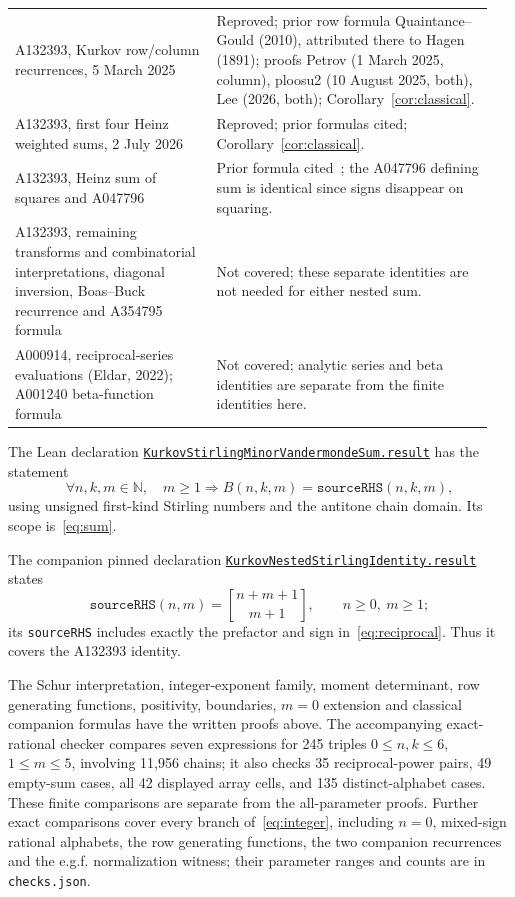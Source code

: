 \documentclass[11pt]{article}
\newcommand{\stir}[2]{\genfrac{[}{]}{0pt}{}{#1}{#2}}
\begin{document}
\begin{longtable}{@{}p{0.40\linewidth}p{0.55\linewidth}@{}}
A132393, Kurkov row/column recurrences, 5 March 2025 & Reproved; prior row formula Quaintance--Gould (2010), attributed there to Hagen (1891); proofs Petrov (1 March 2025, column), ploosu2 (10 August 2025, both), Lee (2026, both); Corollary~\ref{cor:classical}.\\
A132393, first four Heinz weighted sums, 2 July 2026 & Reproved; prior formulas cited; Corollary~\ref{cor:classical}.\\
A132393, Heinz sum of squares and A047796 & Prior formula cited~\cite{weighted}; the A047796 defining sum is identical since signs disappear on squaring.\\
A132393, remaining transforms and combinatorial interpretations, diagonal inversion, Boas--Buck recurrence and A354795 formula & Not covered; these separate identities are not needed for either nested sum.\\
A000914, reciprocal-series evaluations (Eldar, 2022); A001240 beta-function formula & Not covered; analytic series and beta identities are separate from the finite identities here.\\\bottomrule
\end{longtable}
\normalsize

\medskip
The Lean declaration
\href{https://github.com/the-omega-institute/trureturing/blob/0eae8e045cb2ba958e2097dbac034f62f9c1dd7a/D5/S3/Combinatorics/BinomialBases/KurkovStirlingMinorVandermondeSum.lean}{\texttt{KurkovStirlingMinor}\allowbreak\texttt{VandermondeSum.result}}
has the statement
\[
\forall n,k,m\in\mathbb N,\quad m\geq1\Rightarrow B(n,k,m)=\texttt{sourceRHS}(n,k,m),
\]
using unsigned first-kind Stirling numbers and
the antitone chain domain. Its scope is~\eqref{eq:sum}.

The companion pinned declaration
\href{https://github.com/the-omega-institute/trureturing/blob/0eae8e045cb2ba958e2097dbac034f62f9c1dd7a/D5/S1/Recurrence/Algebraic/KurkovNestedStirlingIdentity.lean}{\texttt{KurkovNestedStirlingIdentity.}\allowbreak\texttt{result}}
states
\[
\texttt{sourceRHS}(n,m)=\stir{n+m+1}{m+1},\qquad n\geq0,\ m\geq1;
\]
its \texttt{sourceRHS} includes exactly the prefactor and sign
in~\eqref{eq:reciprocal}. Thus it covers the A132393 identity.

The Schur interpretation, integer-exponent family, moment determinant,
row generating functions, positivity, boundaries, $m=0$ extension and
classical companion formulas have the written proofs above.
The accompanying exact-rational checker compares seven expressions for
245 triples $0\leq n,k\leq6$, $1\leq m\leq5$, involving 11,956 chains;
it also checks 35 reciprocal-power pairs, 49 empty-sum cases, all 42 displayed
array cells, and 135 distinct-alphabet cases. These finite comparisons are
separate from the all-parameter proofs. Further exact comparisons cover
every branch of~\eqref{eq:integer}, including $n=0$, mixed-sign rational alphabets,
the row generating functions, the two companion recurrences and the e.g.f.
normalization witness; their parameter ranges and counts are in \texttt{checks.json}.
\end{document}
